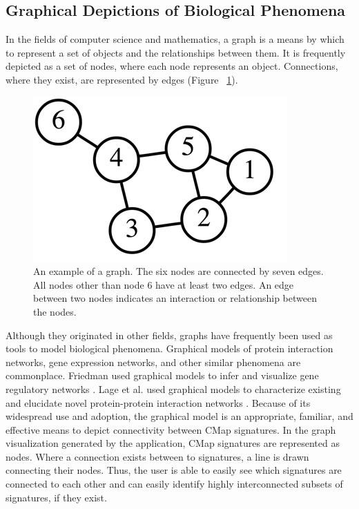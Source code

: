 \documentclass[12pt]{article}
\begin{document}
\subsection{Graphical Depictions of Biological Phenomena}

In the fields of computer science and mathematics, a graph is a means by which to represent a set of objects and the relationships between them. It is frequently depicted as a set of nodes, where each node represents an object. Connections, where they exist, are represented by edges (Figure ~\ref{fig:graph}).


\begin{figure}[h]
\centering
\includegraphics[scale=0.5]{img/graph_example.png}
\caption{An example of a graph. The six nodes are connected by seven edges. All nodes other than node 6 have at least two edges. An edge between two nodes indicates an interaction or relationship between the nodes.}
\label{fig:graph}
\end{figure} 

Although they originated in other fields, graphs have frequently been used as tools to model biological phenomena. Graphical models of protein interaction networks, gene expression networks, and other similar phenomena are commonplace. Friedman used graphical models to infer and visualize gene regulatory networks \cite{friedman_inferring_2004}. Lage et al. used graphical models to characterize existing and elucidate novel protein-protein interaction networks \cite{lage_human_2007}. Because of its widespread use and adoption, the graphical model is an appropriate, familiar, and effective means to depict connectivity between CMap signatures.
In the graph visualization generated by the application, CMap signatures are represented as nodes. Where a connection exists between to signatures, a line is drawn connecting their nodes. Thus, the user is able to easily see which signatures are connected to each other and can easily identify highly interconnected subsets of signatures, if they exist. 
 
\end{document}
